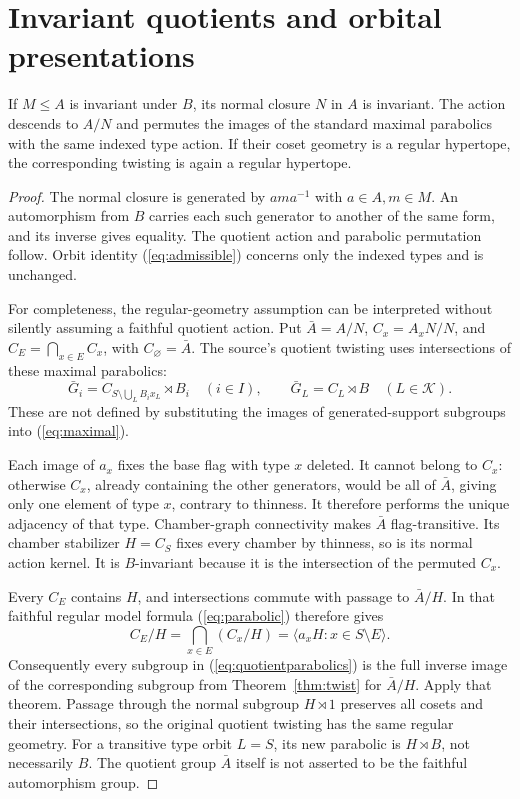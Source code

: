 \section{Invariant quotients and orbital presentations}
\begin{lemma}[Quotients]\label{lem:quotient}
If $M\leq A$ is invariant under $B$, its normal closure $N$ in $A$ is invariant. The action descends to $A/N$ and permutes the images of the standard maximal parabolics with the same indexed type action. If their coset geometry is a regular hypertope, the corresponding twisting is again a regular hypertope.
\end{lemma}
\begin{proof}
The normal closure is generated by $a m a^{-1}$ with $a\in A,m\in M$. An automorphism from $B$ carries each such generator to another of the same form, and its inverse gives equality. The quotient action and parabolic permutation follow. Orbit identity (\ref{eq:admissible}) concerns only the indexed types and is unchanged.

For completeness, the regular-geometry assumption can be interpreted without silently assuming a faithful quotient action. Put $\bar A=A/N$, $C_x=A_xN/N$, and $C_E=\bigcap_{x\in E}C_x$, with $C_\varnothing=\bar A$. The source's quotient twisting uses intersections of these maximal parabolics:
\begin{equation}\label{eq:quotientparabolics}
\bar G_i=C_{S\setminus\bigcup_L B_ix_L}\rtimes B_i\quad(i\in I),
\qquad \bar G_L=C_L\rtimes B\quad(L\in\mathcal K).
\end{equation}
These are not defined by substituting the images of generated-support subgroups into (\ref{eq:maximal}).

Each image of $a_x$ fixes the base flag with type $x$ deleted. It cannot belong to $C_x$: otherwise $C_x$, already containing the other generators, would be all of $\bar A$, giving only one element of type $x$, contrary to thinness. It therefore performs the unique adjacency of that type. Chamber-graph connectivity makes $\bar A$ flag-transitive. Its chamber stabilizer $H=C_S$ fixes every chamber by thinness, so is its normal action kernel. It is $B$-invariant because it is the intersection of the permuted $C_x$.

Every $C_E$ contains $H$, and intersections commute with passage to $\bar A/H$. In that faithful regular model formula (\ref{eq:parabolic}) therefore gives
\[
C_E/H=\bigcap_{x\in E}(C_x/H)
=\langle a_xH:x\in S\setminus E\rangle.
\]
Consequently every subgroup in (\ref{eq:quotientparabolics}) is the full inverse image of the corresponding subgroup from Theorem~\ref{thm:twist} for $\bar A/H$. Apply that theorem. Passage through the normal subgroup $H\rtimes1$ preserves all cosets and their intersections, so the original quotient twisting has the same regular geometry. For a transitive type orbit $L=S$, its new parabolic is $H\rtimes B$, not necessarily $B$. The quotient group $\bar A$ itself is not asserted to be the faithful automorphism group.
\end{proof}

